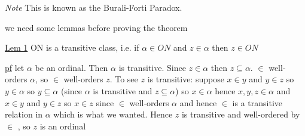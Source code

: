 \documentclass{article}
\begin{document}
    \emph{Note} This is known as the Burali-Forti Paradox.

    we need some lemmas before proving the theorem

    \underline{Lem 1} ON is a transitive class, i.e. if $\alpha \in ON$ and $z \in \alpha$ then $z \in ON$

    \underline{pf} let $\alpha$ be an ordinal.
    Then $\alpha$ is transitive.
    Since $z \in \alpha$ then $z \subseteq \alpha$.
    $\in$ well-orders $\alpha$, so $\in$ well-orders $z$.
    To see $z$ is transitive: suppose $x \in y$ and $y \in z$
    so $y \in \alpha$ so $y \subseteq \alpha$ (since $\alpha$ is transitive and $z \subseteq \alpha$)
    so $x \in \alpha$
    hence $x,y,z \in \alpha$ and $x \in y$ and $y \in z$ so $x \in z$
    since $\in$ well-orders $\alpha$ and hence $\in$ is a transitive relation in $\alpha$
    which is what we wanted.
    Hence $z$ is transitive and well-ordered by $\in$ , so $z$ is an ordinal
\end{document}
